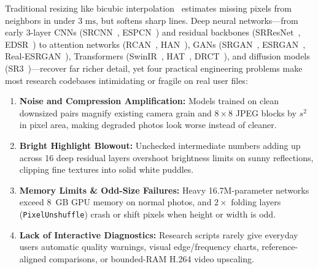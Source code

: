 \documentclass[10pt,onecolumn,journal]{IEEEtran}
\begin{document}
Traditional resizing like bicubic interpolation~\cite{keys1981cubic} estimates missing pixels from neighbors in under $3\text{ ms}$, but softens sharp lines. Deep neural networks---from early 3-layer CNNs (SRCNN~\cite{dong2016srcnn}, ESPCN~\cite{shi2016espcn}) and residual backbones (SRResNet~\cite{ledig2017srgan}, EDSR~\cite{lim2017edsr}) to attention networks (RCAN~\cite{zhang2018rcan}, HAN~\cite{niu2020han}), GANs (SRGAN~\cite{ledig2017srgan}, ESRGAN~\cite{wang2018esrgan}, Real-ESRGAN~\cite{wang2021realesrgan}), Transformers (SwinIR~\cite{liang2021swinir}, HAT~\cite{chen2023hat}, DRCT~\cite{hsu2024drct}), and diffusion models (SR3~\cite{saharia2023sr3})---recover far richer detail, yet four practical engineering problems make most research codebases intimidating or fragile on real user files:
\begin{enumerate}
    \item \textbf{Noise and Compression Amplification:} Models trained on clean downsized pairs magnify existing camera grain and $8\times8$ JPEG blocks by $s^2$ in pixel area, making degraded photos look worse instead of cleaner.
    \item \textbf{Bright Highlight Blowout:} Unchecked intermediate numbers adding up across 16 deep residual layers overshoot brightness limits on sunny reflections, clipping fine textures into solid white puddles.
    \item \textbf{Memory Limits \& Odd-Size Failures:} Heavy 16.7M-parameter networks exceed 8~GB GPU memory on normal photos, and $2\times$ folding layers (\texttt{PixelUnshuffle}) crash or shift pixels when height or width is odd.
    \item \textbf{Lack of Interactive Diagnostics:} Research scripts rarely give everyday users automatic quality warnings, visual edge/frequency charts, reference-aligned comparisons, or bounded-RAM H.264 video upscaling.
\end{enumerate}
\end{document}

